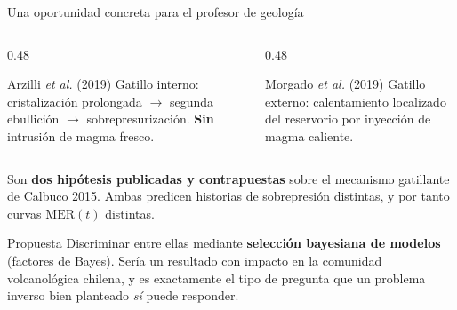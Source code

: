 \documentclass[aspectratio=169,10pt,t]{beamer}
\newcommand{\MER}{\mathrm{MER}}
\begin{document}
\begin{frame}{Una oportunidad concreta para el profesor de geología}
\begin{columns}[T]
\begin{column}{0.48\textwidth}
\begin{block}{Arzilli \emph{et al.} (2019)}
Gatillo \alert{interno}: cristalización prolongada $\to$ segunda ebullición
$\to$ sobrepresurización. \textbf{Sin} intrusión de magma fresco.
\end{block}
\end{column}
\begin{column}{0.48\textwidth}
\begin{block}{Morgado \emph{et al.} (2019)}
Gatillo \alert{externo}: calentamiento localizado del reservorio por inyección
de magma caliente.
\end{block}
\end{column}
\end{columns}

\vspace{1em}
Son \textbf{dos hipótesis publicadas y contrapuestas} sobre el mecanismo
gatillante de Calbuco 2015. Ambas predicen \alert{historias de sobrepresión
distintas}, y por tanto \alert{curvas $\MER(t)$ distintas}.

\vspace{1em}
\begin{exampleblock}{Propuesta}
Discriminar entre ellas mediante \textbf{selección bayesiana de modelos}
(factores de Bayes). Sería un resultado con impacto en la comunidad
volcanológica chilena, y es exactamente el tipo de pregunta que un problema
inverso bien planteado \emph{sí} puede responder.
\end{exampleblock}
\end{frame}
\end{document}
